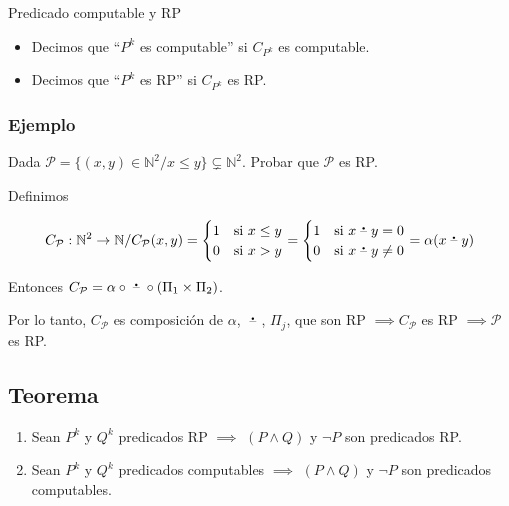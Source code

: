 \medskip

\begin{definicion}{Predicado computable y RP}{}
    \begin{itemize}
        \item Decimos que ``$P^k$ es computable'' si 
            $C_{P^k}$ es computable.
        \item Decimos que ``$P^k$ es RP'' si 
            $C_{P^k}$ es RP.
    \end{itemize}

\end{definicion}

\subsubsection{Ejemplo}

Dada $\mathcal{P} = \{ (x,y) \in \mathbb{N}^2 / x \leq y \} \subsetneq \mathbb{N}^2$.
Probar que $\mathcal{P}$ es RP.

Definimos

\begin{gather*}
    C_{\mathcal{P}}: \mathbb{N}^2 \to \mathbb{N} / C_{\mathcal{P}} (x,y) =
    \begin{cases}
        1 & \text{si } x \leq y \\
        0 & \text{si } x > y
    \end{cases} =
    \begin{cases}
        1 & \text{si } x \;\accentset{\mbox{\large\bfseries .}}{\text{--}}\; y  = 0\\
        0 & \text{si } x \;\accentset{\mbox{\large\bfseries .}}{\text{--}}\; y \neq 0
    \end{cases} = \alpha(x \;\accentset{\mbox{\large\bfseries .}}{\text{--}}\; y)
\end{gather*}

%
Entonces $C_{\mathcal{P}} 
= \alpha \circ \;\accentset{\mbox{\large\bfseries .}}{\text{--}}\; \circ (\Pi_1 \times \Pi_2)$.

Por lo tanto, $C_{\mathcal{P}}$ es composición de $\alpha$, $\;\accentset{\mbox{\large\bfseries .}}{\text{--}}\;$,
$\Pi_j$, que son RP $\implies C_{\mathcal{P}}$ es RP $\implies \mathcal{P}$ es
RP.

\subsection{Teorema}

\begin{teorema}{}{}
    \begin{enumerate}
        \item Sean $P^k$ y ${Q}^k$ predicados RP $\implies$
            $(P \wedge Q)$ y $\neg P$ son predicados RP.
        \item Sean ${P}^k$ y ${Q}^k$ predicados computables
            $\implies$ $(P \wedge Q)$ y $\neg P$ son predicados computables.
    \end{enumerate}
\end{teorema}

